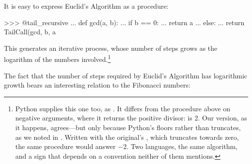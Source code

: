 It is easy to express Euclid's Algorithm as a procedure:

\begin{codeBlock}
>>> @tail_recursive
... def gcd(a, b):
...     if b == 0:
...         return a
...     else:
...         return TailCall(gcd, b, a %
\end{codeBlock}

\noindent
This generates an iterative process, whose number of steps grows as the
logarithm of the numbers involved.\footnote{Python supplies this one too, as
.  It differs from the procedure above on negative arguments,
where it returns the positive divisor:  is 2.  Our
version, as it happens, agrees---but only because Python's \code{\%} floors
rather than truncates, as we noted in .  Written with the
original's , which truncates towards zero, the same procedure
would answer \( -2 \).  Two languages, the same algorithm, and a sign that
depends on a convention neither of them mentions.}

The fact that the number of steps required by Euclid's Algorithm has
logarithmic growth bears an interesting relation to the Fibonacci numbers:


